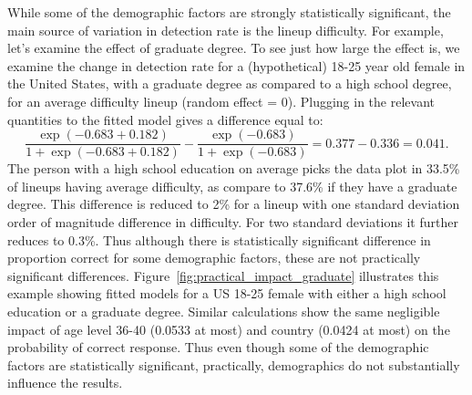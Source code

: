 \documentclass[10pt]{article}\usepackage[]{graphicx}\usepackage[]{color}
\begin{document}
While some of the demographic factors are strongly statistically significant, the main source of variation in detection rate is the lineup difficulty. For example, let's examine the effect of graduate degree. To see just how large the effect is, we examine the change in detection rate for a (hypothetical) 18-25 year old female in the United States, with a graduate degree as compared to a high school degree, for an average difficulty lineup (random effect = 0). Plugging in the relevant quantities to the fitted model gives a difference equal to:
$$ \frac {\exp(-0.683+0.182)}{1+\exp(-0.683+0.182)}-  \frac {\exp(-0.683)}{1+\exp(-0.683)} = 0.377- 0.336 =0.041.$$ 
The person with a high school education on average picks the data plot in 33.5\% of lineups having average difficulty, as compare to 37.6\% if they have a graduate degree. This difference is reduced to 2\% for a lineup with one standard deviation order of magnitude difference in difficulty. For two standard deviations it further reduces to 0.3\%. Thus although there is statistically significant difference in proportion correct for some demographic factors, these are not practically significant differences.  Figure~\ref{fig:practical_impact_graduate} illustrates this example showing fitted models for a US 18-25 female with either a high school education or a graduate degree.  Similar calculations show the same negligible impact of age level 36-40 (0.0533 at most)  and country (0.0424 at most) on the probability of correct response. Thus even though some of the demographic factors are statistically significant, practically, demographics do not substantially influence the results. 
\end{document}
